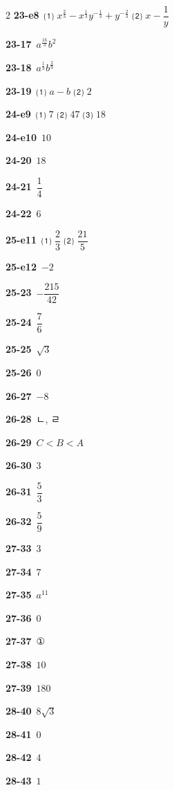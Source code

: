 \documentclass[10pt,a4paper]{article}
\begin{document}
\begin{multicols}{2}
\noindent\textbf{23-e8}\ ⑴ $x^{\frac{2}{3}}-x^{\frac{1}{3}}y^{-\frac{1}{3}}+y^{-\frac{2}{3}}$ ⑵ $x-\dfrac{1}{y}$\par
\noindent\textbf{23-17}\ $a^{\frac{16}{3}}b^{2}$\par
\noindent\textbf{23-18}\ $a^{\frac{1}{3}}b^{\frac{2}{9}}$\par
\noindent\textbf{23-19}\ ⑴ $a-b$ ⑵ $2$\par
\noindent\textbf{24-e9}\ ⑴ $7$ ⑵ $47$ ⑶ $18$\par
\noindent\textbf{24-e10}\ $10$\par
\noindent\textbf{24-20}\ $18$\par
\noindent\textbf{24-21}\ $\dfrac{1}{4}$\par
\noindent\textbf{24-22}\ $6$\par
\noindent\textbf{25-e11}\ ⑴ $\dfrac{2}{3}$ ⑵ $\dfrac{21}{5}$\par
\noindent\textbf{25-e12}\ $-2$\par
\noindent\textbf{25-23}\ $-\dfrac{215}{42}$\par
\noindent\textbf{25-24}\ $\dfrac{7}{6}$\par
\noindent\textbf{25-25}\ $\sqrt{3}$\par
\noindent\textbf{25-26}\ $0$\par
\noindent\textbf{26-27}\ $-8$\par
\noindent\textbf{26-28}\ ㄴ, ㄹ\par
\noindent\textbf{26-29}\ $C<B<A$\par
\noindent\textbf{26-30}\ $3$\par
\noindent\textbf{26-31}\ $\dfrac{5}{3}$\par
\noindent\textbf{26-32}\ $\dfrac{5}{9}$\par
\noindent\textbf{27-33}\ $3$\par
\noindent\textbf{27-34}\ $7$\par
\noindent\textbf{27-35}\ $a^{11}$\par
\noindent\textbf{27-36}\ $0$\par
\noindent\textbf{27-37}\ ①\par
\noindent\textbf{27-38}\ $10$\par
\noindent\textbf{27-39}\ $180$\par
\noindent\textbf{28-40}\ $8\sqrt{3}$\par
\noindent\textbf{28-41}\ $0$\par
\noindent\textbf{28-42}\ $4$\par
\noindent\textbf{28-43}\ $1$\par

\end{multicols}
\end{document}
